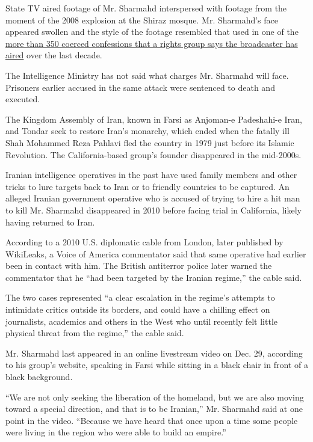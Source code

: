 State TV aired footage of Mr. Sharmahd interspersed with footage from
the moment of the 2008 explosion at the Shiraz mosque. Mr. Sharmahd's
face appeared swollen and the style of the footage resembled that used
in one of the
\href{https://apnews.com/2f5e336cb7f96c2829a98a522f705855}{more than 350
coerced confessions that a rights group says the broadcaster has aired}
over the last decade.

The Intelligence Ministry has not said what charges Mr. Sharmahd will
face. Prisoners earlier accused in the same attack were sentenced to
death and executed.

The Kingdom Assembly of Iran, known in Farsi as Anjoman-e Padeshahi-e
Iran, and Tondar seek to restore Iran's monarchy, which ended when the
fatally ill Shah Mohammed Reza Pahlavi fled the country in 1979 just
before its Islamic Revolution. The California-based group's founder
disappeared in the mid-2000s.

Iranian intelligence operatives in the past have used family members and
other tricks to lure targets back to Iran or to friendly countries to be
captured. An alleged Iranian government operative who is accused of
trying to hire a hit man to kill Mr. Sharmahd disappeared in 2010 before
facing trial in California, likely having returned to Iran.

According to a 2010 U.S. diplomatic cable from London, later published
by WikiLeaks, a Voice of America commentator said that same operative
had earlier been in contact with him. The British antiterror police
later warned the commentator that he ``had been targeted by the Iranian
regime,'' the cable said.

The two cases represented ``a clear escalation in the regime's attempts
to intimidate critics outside its borders, and could have a chilling
effect on journalists, academics and others in the West who until
recently felt little physical threat from the regime,'' the cable said.

Mr. Sharmahd last appeared in an online livestream video on Dec. 29,
according to his group's website, speaking in Farsi while sitting in a
black chair in front of a black background.

``We are not only seeking the liberation of the homeland, but we are
also moving toward a special direction, and that is to be Iranian,'' Mr.
Sharmahd said at one point in the video. ``Because we have heard that
once upon a time some people were living in the region who were able to
build an empire.''

